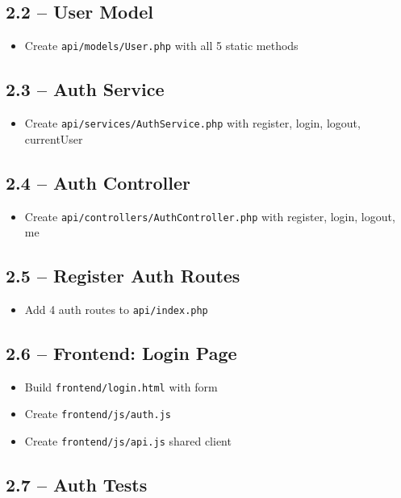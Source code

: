 \documentclass[11pt,a4paper]{article}
\newcommand{\undone}{\textcolor{helixgray}{\texttt{[ ] }}}
\newcommand{\filepath}[1]{\texttt{\small#1}}
\newcommand{\task}[2]{\item[#1] #2}
\begin{document}
\subsection{2.2 -- User Model}

\begin{itemize}
    \task{\undone}{Create \filepath{api/models/User.php} with all 5 static methods}
\end{itemize}

\subsection{2.3 -- Auth Service}

\begin{itemize}
    \task{\undone}{Create \filepath{api/services/AuthService.php} with register, login, logout, currentUser}
\end{itemize}

\subsection{2.4 -- Auth Controller}

\begin{itemize}
    \task{\undone}{Create \filepath{api/controllers/AuthController.php} with register, login, logout, me}
\end{itemize}

\subsection{2.5 -- Register Auth Routes}

\begin{itemize}
    \task{\undone}{Add 4 auth routes to \filepath{api/index.php}}
\end{itemize}

\subsection{2.6 -- Frontend: Login Page}

\begin{itemize}
    \task{\undone}{Build \filepath{frontend/login.html} with form}
    \task{\undone}{Create \filepath{frontend/js/auth.js}}
    \task{\undone}{Create \filepath{frontend/js/api.js} shared client}
\end{itemize}

\subsection{2.7 -- Auth Tests}
\end{document}
